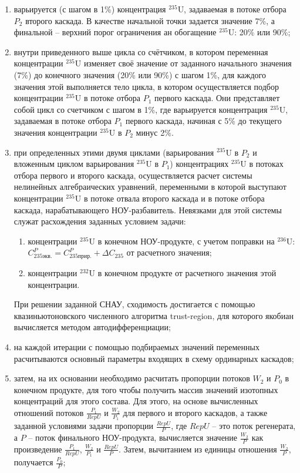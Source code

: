\begin{enumerate}
    \item варьируется (с шагом в 1\%) концентрация $^{235}$U, задаваемая в потоке отбора $P_2$ второго каскада. В качестве начальной точки задается значение 7\%, а финальной -- верхний порог ограничения ан обогащение $^{235}$U: 20\% или 90\%;
    \item внутри приведенного выше цикла со счётчиком, в котором переменная концентрации $^{235}$U изменяет своё значение от заданного начального значения (7\%) до конечного значения (20\% или 90\%) с шагом 1\%, для каждого значения этой выполняется тело цикла, в котором осуществляется подбор концентрации $^{235}$U в потоке отбора $P_1$ первого каскада. Они представляет собой цикл со счетчиком с шагом в 1\%, где варьируется концентрация $^{235}$U, задаваемая в потоке отбора $P_1$ первого каскада, начиная с 5\% до текущего значения концентрации $^{235}$U в $P_2$ минус 2\%.
    \item при определенных этими двумя циклами (варьирования $^{235}$U в $P_2$ и вложенным циклом варьирования $^{235}$U в $P_1$) концентрациях $^{235}$U в потоках отбора первого и второго каскада, осуществляется расчет системы нелинейных алгебраических уравнений, переменными в которой выступают концентрации $^{235}$U в потоке отвала второго каскада и в потоке отбора каскада, нарабатывающего НОУ-разбавитель. Невязками для этой системы служат расхождения заданных условием задачи:
    \begin{enumerate}
        \item концентрации $^{235}$U в  конечном НОУ-продукте, с учетом поправки на $^{236}$U: $C_{235 экв.}^{P}=C_{235 прир.}^{P}+\Delta C_{235}$ от расчетного значения;
        \item концентрации $^{232}$U в конечном продукте от расчетного значения этой концентрации.
    \end{enumerate}
    При решении заданной СНАУ, сходимость достигается с помощью квазиньютоновского численного алгоритма trust-region, для которого якобиан вычисляется методом автодифференциации;
    \item  на каждой итерации с помощью подбираемых значений переменных расчитываются основный параметры входящих в схему ординарных каскадов;
    \item  затем, на их основании необходимо расчитать пропорции потоков $W_2$ и $P_0$ в конечном продукте, для того чтобы получить массив значений изотопных концентраций для этого состава. Для этого, на основе вычисленных отношений потоков $\frac{P_{1}}{RepU}$ и $\frac{W_{2}}{P_{1}}$ для первого и второго каскадов, а также заданной условиями задачи пропорции $\frac{RepU}{P}$, где $RepU$ -- это поток регенерата, а $P$ -- поток финального НОУ-продукта, вычисляется значение $\frac{W_{2}}{P}$ как произведение $\frac{P_{1}}{RepU}$, $\frac{W_{2}}{P_{1}}$ и $\frac{RepU}{P}$. Затем, вычитанием из единицы отношения $\frac{W_{2}}{P}$, получается $\frac{P_{0}}{P}$;

\end{enumerate}
